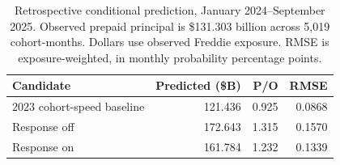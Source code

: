 \begin{table}[H]
\centering\small
\caption{Retrospective conditional prediction, January 2024--September 2025. Observed prepaid principal is \$131.303 billion across 5,019 cohort-months. Dollars use observed Freddie exposure. RMSE is exposure-weighted, in monthly probability percentage points.}
\label{tab:validation}
\begin{tabular}{@{}p{6cm}rrr@{}}\toprule
Candidate & Predicted (\$B) & P/O & RMSE\\\midrule
2023 cohort-speed baseline & 121.436 & 0.925 & 0.0868\\
Response off & 172.643 & 1.315 & 0.1570\\
Response on & 161.784 & 1.232 & 0.1339\\
\bottomrule
\end{tabular}
\end{table}
